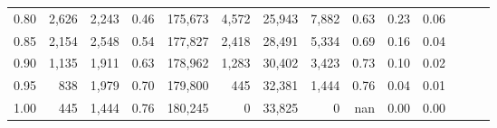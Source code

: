 \begin{tabular}{rrrrrrrrrrrrrr}
0.80 &   2,626 &  2,243 &  0.46 &  175,673 &    4,572 &  25,943 &   7,882 &  0.63 &  0.23 &      0.06 \\
0.85 &   2,154 &  2,548 &  0.54 &  177,827 &    2,418 &  28,491 &   5,334 &  0.69 &  0.16 &      0.04 \\
0.90 &   1,135 &  1,911 &  0.63 &  178,962 &    1,283 &  30,402 &   3,423 &  0.73 &  0.10 &      0.02 \\
0.95 &     838 &  1,979 &  0.70 &  179,800 &      445 &  32,381 &   1,444 &  0.76 &  0.04 &      0.01 \\
1.00 &     445 &  1,444 &  0.76 &  180,245 &        0 &  33,825 &       0 &   nan &  0.00 &      0.00 \\
\bottomrule
\end{tabular}
